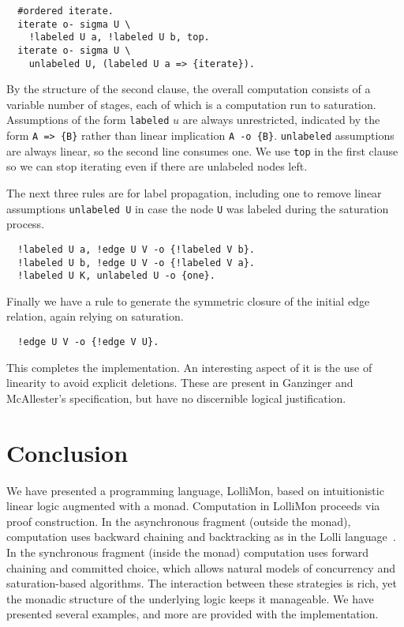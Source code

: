 \documentclass{sig-alt}
\begin{document}
\begin{small}\begin{verbatim}
  #ordered iterate.
  iterate o- sigma U \
    !labeled U a, !labeled U b, top.
  iterate o- sigma U \
    unlabeled U, (labeled U a => {iterate}).
\end{verbatim}\end{small}

\noindent By the structure of the second clause,
the overall computation consists of a variable number of
stages, each of which is a computation run to saturation.
Assumptions of the form \texttt{labeled} $u$ are always
unrestricted,
indicated by the form \texttt{A => \{B\}} rather than linear
implication \texttt{A -o \{B\}}.  \texttt{unlabeled} assumptions are
always linear, so the second line consumes one.  We use
\texttt{top} in the first clause so we can stop iterating
even if there are unlabeled nodes left.

The next three rules are for label propagation, including
one to remove linear assumptions \texttt{unlabeled U} in case
the node \texttt{U} was labeled during the saturation process.

\begin{small}\begin{verbatim}
  !labeled U a, !edge U V -o {!labeled V b}.
  !labeled U b, !edge U V -o {!labeled V a}.
  !labeled U K, unlabeled U -o {one}.
\end{verbatim}\end{small}

Finally we have a rule to generate the symmetric closure
of the initial edge relation, again relying on saturation.

\begin{small}\begin{verbatim}
  !edge U V -o {!edge V U}.
\end{verbatim}\end{small}

This completes the implementation.  An interesting aspect of it is the
use of linearity to avoid explicit deletions.  These are present in
Ganzinger and McAllester's specification, but have no discernible
logical justification.

\section{Conclusion}
\label{sec:conclusion}

We have presented a programming language, LolliMon, based on intuitionistic
linear logic augmented with a monad.  Computation in LolliMon proceeds via proof
construction.  In the asynchronous fragment (outside the monad),
computation uses backward chaining and backtracking as in the Lolli
language~\cite{Hodas94ic}.  In the synchronous fragment (inside the
monad) computation uses forward chaining and committed choice, which
allows natural models of concurrency and saturation-based
algorithms.  The interaction between these strategies is rich,
yet the monadic structure of the underlying logic keeps it manageable.
We have presented several examples, and more are provided with the
implementation.
\end{document}
